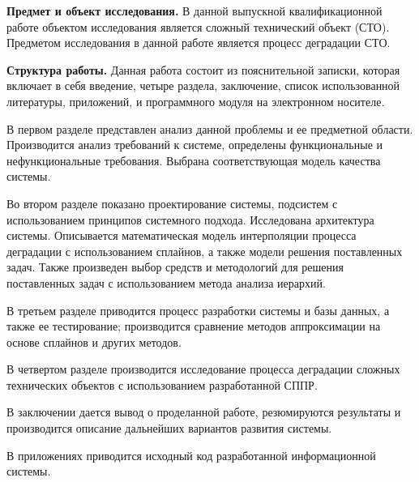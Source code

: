\textbf{Предмет и объект исследования.}
В данной выпускной квалификационной работе объектом исследования является сложный технический объект (СТО).
Предметом исследования в данной работе является процесс деградации СТО.

\textbf{Структура работы.}
Данная работа состоит из пояснительной записки, которая включает в себя введение, четыре раздела, заключение, список использованной литературы, приложений, и программного модуля на электронном носителе.

В первом разделе представлен анализ данной проблемы и ее предметной области. 
Производится анализ требований к системе, определены функциональные и нефункциональные требования. 
Выбрана соответствующая модель качества системы. 

Во втором разделе показано проектирование системы, подсистем с использованием принципов системного подхода. 
Исследована архитектура системы. 
Описывается математическая модель интерполяции процесса деградации с использованием сплайнов, а также модели решения поставленных задач. 
Также произведен выбор средств и методологий для решения поставленных задач с использованием метода анализа иерархий.

В третьем разделе приводится процесс разработки системы и базы данных, а также ее тестирование; производится сравнение методов аппроксимации на основе сплайнов и других методов.

В четвертом разделе производится исследование процесса деградации сложных технических объектов с использованием разработанной СППР.

В заключении дается вывод о проделанной работе, резюмируются результаты и производится описание дальнейших вариантов развития системы.

В приложениях приводится исходный код разработанной информационной системы.




